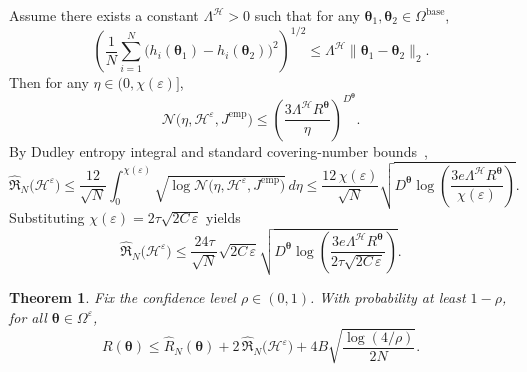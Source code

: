 \documentclass{article}
\theoremstyle{plain}
\newtheorem{theorem}{Theorem}[section]
\theoremstyle{definition}
\theoremstyle{remark}
\begin{document}
	Assume there exists a constant $\Lambda^{\mathcal{H}}>0$ such that for any $\boldsymbol{\theta}_1,\boldsymbol{\theta}_2\in\Omega^{\mathrm{base}}$,
	\begin{equation*}
		\left(\frac{1}{N}\sum_{i=1}^N\bigl(h_i(\boldsymbol{\theta}_1)-h_i(\boldsymbol{\theta}_2)\bigr)^2\right)^{1/2}
		\le
		\Lambda^{\mathcal{H}}\|\boldsymbol{\theta}_1-\boldsymbol{\theta}_2\|_2.
	\end{equation*}
	Then for any $\eta\in(0,\chi(\varepsilon)]$,
	\begin{equation*}
		\mathcal N\bigl(\eta,\mathcal{H}^{\varepsilon},J^{\mathrm{emp}}\bigr)
		\le
		\left(\frac{3\Lambda^{\mathcal{H}} R^{\boldsymbol{\theta}}}{\eta}\right)^{D^{\boldsymbol{\theta}}}.
	\end{equation*}
	By Dudley entropy integral and standard covering-number bounds~\citep{bartlett2002rademacher,bartlett2005local},
	\begin{equation*}
		\widehat{\mathfrak R}_{N}\bigl(\mathcal{H}^{\varepsilon}\bigr)
		\le
		\frac{12}{\sqrt N}\int_0^{\chi(\varepsilon)}\sqrt{\log\mathcal N\bigl(\eta,\mathcal{H}^{\varepsilon},J^{\mathrm{emp}}\bigr)}\,d\eta
		\le
		\frac{12\,\chi(\varepsilon)}{\sqrt N}\sqrt{D^{\boldsymbol{\theta}}\log\left(\frac{3e\Lambda^{\mathcal{H}} R^{\boldsymbol{\theta}}}{\chi(\varepsilon)}\right)}.
	\end{equation*}
	Substituting $\chi(\varepsilon)=2\tau\sqrt{2C\,\varepsilon}$ yields
	\begin{equation*}
		\widehat{\mathfrak R}_{N}\bigl(\mathcal{H}^{\varepsilon}\bigr)
		\le
		\frac{24\tau}{\sqrt N}\sqrt{2C\,\varepsilon}\sqrt{D^{\boldsymbol{\theta}}\log\left(\frac{3e\Lambda^{\mathcal{H}} R^{\boldsymbol{\theta}}}{2\tau\sqrt{2C\,\varepsilon}}\right)}.
	\end{equation*}
	\begin{theorem}\label{thm:app_gen}
		Fix the confidence level $\rho\in(0,1)$.
		With probability at least $1-\rho$, for all $\boldsymbol{\theta}\in\Omega^{\varepsilon}$,
		\begin{equation*}
			R(\boldsymbol{\theta})
			\le
			\widehat R_{N}(\boldsymbol{\theta})
			+
			2\,\widehat{\mathfrak R}_{N}\bigl(\mathcal{H}^{\varepsilon}\bigr)
			+
			4B\sqrt{\frac{\log(4/\rho)}{2N}}.
		\end{equation*}
	\end{theorem}
\end{document}
